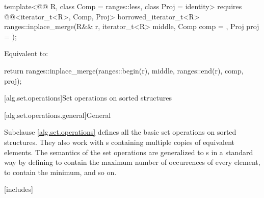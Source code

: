 \begin{itemdecl}
template<@@ R, class Comp = ranges::less, class Proj = identity>
  requires @@<iterator_t<R>, Comp, Proj>
  borrowed_iterator_t<R>
    ranges::inplace_merge(R&& r, iterator_t<R> middle, Comp comp = {}, Proj proj = {});
\end{itemdecl}

\begin{itemdescr}
\pnum
\effects
Equivalent to:
\begin{codeblock}
return ranges::inplace_merge(ranges::begin(r), middle, ranges::end(r), comp, proj);
\end{codeblock}
\end{itemdescr}

[alg.set.operations]{Set operations on sorted structures}

[alg.set.operations.general]{General}

\pnum
Subclause \ref{alg.set.operations} defines all the basic set operations on sorted structures.
They also work with s
containing multiple copies of equivalent elements.
The semantics of the set operations are generalized to s
in a standard way by defining 
to contain the maximum number of occurrences of every element,
 to contain the minimum, and so on.

[includes]{}


